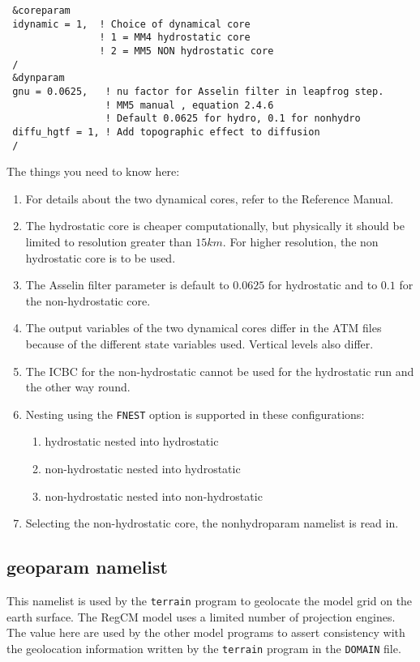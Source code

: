 {\footnotesize
\begin{Verbatim}
 &coreparam
 idynamic = 1,  ! Choice of dynamical core
                ! 1 = MM4 hydrostatic core
                ! 2 = MM5 NON hydrostatic core
 /
 &dynparam
 gnu = 0.0625,   ! nu factor for Asselin filter in leapfrog step.
                 ! MM5 manual , equation 2.4.6
                 ! Default 0.0625 for hydro, 0.1 for nonhydro
 diffu_hgtf = 1, ! Add topographic effect to diffusion
 /
\end{Verbatim}
}

The things you need to know here:

\begin{enumerate}
\item For details about the two dynamical cores, refer to the Reference Manual.
\item The hydrostatic core is cheaper computationally, but physically it should
be limited to resolution greater than $15 km$. For higher resolution, the non
hydrostatic core is to be used.
\item The Asselin filter parameter is default to $0.0625$ for hydrostatic and
to $0.1$ for the non-hydrostatic core.
\item The output variables of the two dynamical cores differ in the ATM files
because of the different state variables used. Vertical levels also differ.
\item The ICBC for the non-hydrostatic cannot be used for the hydrostatic run
and the other way round.
\item Nesting using the \verb=FNEST= option is supported in these
configurations:
\begin{enumerate}
\item hydrostatic nested into hydrostatic
\item non-hydrostatic nested into hydrostatic
\item non-hydrostatic nested into non-hydrostatic
\end{enumerate}
\item Selecting the non-hydrostatic core, the nonhydroparam namelist is read
in.
\end{enumerate}

\subsection{geoparam namelist}
\label{geoparam}

This namelist is used by the \verb=terrain= program to geolocate the model grid
on the earth surface. The RegCM model uses a limited number of projection
engines. The value here are used by the other model programs to assert
consistency with the geolocation information written by the \verb=terrain=
program in the \verb=DOMAIN= file.


